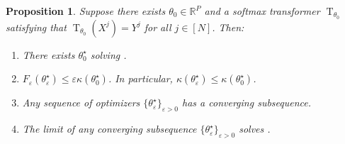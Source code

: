 \documentclass[pdflatex,sn-mathphys-num]{sn-jnl}%
\theoremstyle{thmstyleone}%
\newtheorem{prop}[theorem]{Proposition}
\theoremstyle{thmstyletwo}%
\theoremstyle{thmstylethree}%
\numberwithin{equation}{section}
\newcommand{\R}{\mathbb{R}}
\DeclareMathOperator{\T}{\mathrm{T}}
\begin{document}
\begin{prop}\label{prop:tikhonovProposition}
Suppose there exists $\theta_0\in \R^P$ and a softmax transformer $\T_{\theta_0}$ satisfying that $\T_{\theta_0}(X^j) = Y^j$ for all $j \in [N]$. Then:
\begin{enumerate}%
    \item[i)] There exists $\theta^\star_0$ solving .
    \item[ii)] $F_\varepsilon(\theta^\star_\varepsilon) \leq \varepsilon \kappa(\theta^\star_0)$. In particular, $\kappa(\theta^\star_\varepsilon) \leq \kappa(\theta^\star_0)$.
    \item[iii)] Any sequence of optimizers $\{\theta^\star_\varepsilon\}_{\varepsilon > 0}$ has a converging subsequence.
    \item[iv)] The limit of any converging subsequence $\{\theta^\star_\varepsilon\}_{\varepsilon > 0}$ solves .
\end{enumerate}    
\end{prop}
\end{document}
